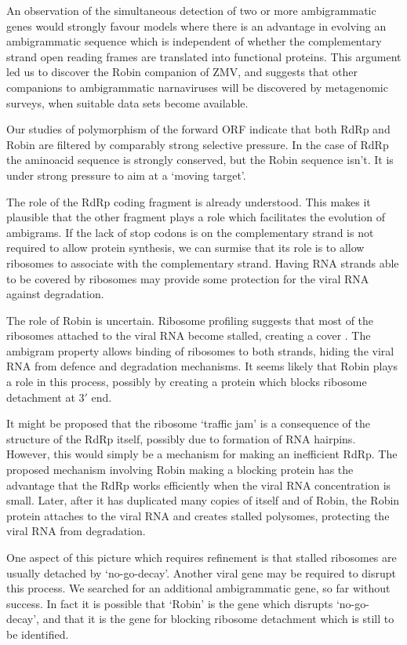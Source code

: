 \documentclass[unnumsec,webpdf,contemporary,large,namedate]{oup-authoring-template}%
\theoremstyle{thmstyleone}%
\theoremstyle{thmstyletwo}%
\theoremstyle{thmstylethree}%
\begin{document}
An observation of the simultaneous detection of two or more ambigrammatic genes would 
strongly favour models where there is an advantage in evolving an 
ambigrammatic sequence which is independent of whether the complementary strand open reading 
frames are translated into functional proteins. This argument led us to discover the Robin companion 
of ZMV, and suggests that other companions to ambigrammatic narnaviruses will be discovered 
by metagenomic surveys, when suitable data  sets become available.

Our studies of polymorphism of the forward ORF indicate that both RdRp and Robin are filtered by 
comparably strong selective pressure. In the case of RdRp the aminoacid sequence is strongly conserved, 
but the Robin sequence isn't. It is under strong pressure to aim at a \lq moving target'. 

The role of the RdRp coding fragment 
is already understood. This makes it plausible that the other fragment plays a role which facilitates the 
evolution of ambigrams. If the lack of stop codons is on the complementary strand is not required 
to allow protein synthesis, we can surmise that its role is to allow ribosomes to associate with the 
complementary strand. Having RNA strands able to be covered by ribosomes may provide some protection 
for the viral RNA against degradation. 

The role of Robin is uncertain. Ribosome profiling suggests that most of the ribosomes attached to 
the viral RNA become stalled, creating a cover \cite{Cep20,Ret+20,Wil+21}. The ambigram property 
allows binding of ribosomes to both strands, hiding the viral RNA from defence and degradation mechanisms. 
It seems likely that Robin plays a role in this process, possibly by creating a protein which 
blocks ribosome detachment at $3'$ end. 

It might be proposed that the ribosome \lq traffic jam' is a consequence of the structure of the 
RdRp itself, possibly due to formation of RNA hairpins. However, this would simply be a mechanism 
for making an inefficient RdRp. The proposed mechanism involving Robin making a blocking protein 
has the advantage that the RdRp works efficiently when the viral RNA concentration is small. 
Later, after it has duplicated many copies of itself and of Robin, the Robin protein attaches 
to the viral RNA and creates stalled polysomes, protecting the viral RNA from degradation.

One aspect of this picture which requires refinement  is that stalled ribosomes are usually detached 
by \lq no-go-decay'. Another viral gene may be required to disrupt this process. We searched 
for an additional ambigrammatic gene, so far without success. In fact it is possible that \lq Robin'
is the gene which disrupts \lq no-go-decay', and that it is the gene for blocking ribosome detachment 
which is still to be identified.
\end{document}
